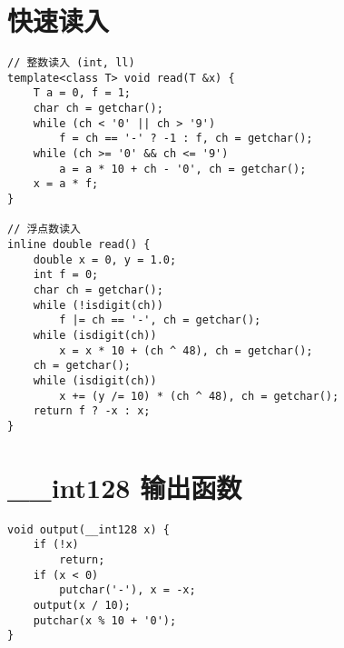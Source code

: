 \section{快速读入}

\begin{verbatim}
// 整数读入 (int, ll)
template<class T> void read(T &x) {
    T a = 0, f = 1;
    char ch = getchar();
    while (ch < '0' || ch > '9')
        f = ch == '-' ? -1 : f, ch = getchar();
    while (ch >= '0' && ch <= '9')
        a = a * 10 + ch - '0', ch = getchar();
    x = a * f;
}

// 浮点数读入
inline double read() {
    double x = 0, y = 1.0;
    int f = 0;
    char ch = getchar();
    while (!isdigit(ch))
        f |= ch == '-', ch = getchar();
    while (isdigit(ch))
        x = x * 10 + (ch ^ 48), ch = getchar();
    ch = getchar();
    while (isdigit(ch))
        x += (y /= 10) * (ch ^ 48), ch = getchar();
    return f ? -x : x;
}
\end{verbatim}

\section{\_\_int128 输出函数}
\begin{verbatim}
void output(__int128 x) {
    if (!x)
        return;
    if (x < 0)
        putchar('-'), x = -x;
    output(x / 10);
    putchar(x % 10 + '0');
}
\end{verbatim}